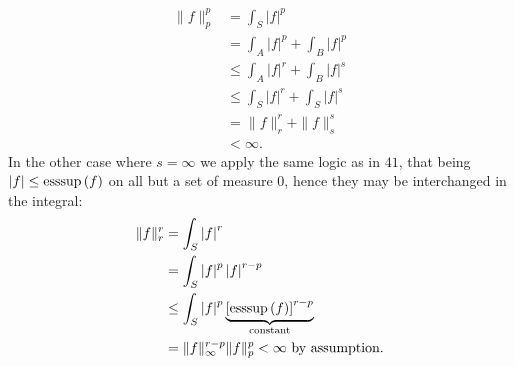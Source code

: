 \documentclass[a4paper]{article}
\begin{document}
\begin{problem}[42]
\begin{enumerate}
		\begin{align*}
			\|f\|_{p}^{p} &= \int_{S} \left| f \right| ^{p}\\
			&= \int_{A} \left| f \right| ^{p} + \int_{B} \left| f \right| ^{p} \\
			&\le \int_{A} \left| f \right| ^{r} + \int_{B} \left| f \right| ^{s} \\
			&\le \int_{S} \left| f \right| ^{r} + \int_{S} \left| f \right| ^{s}\\
			&= \|f\|_{r}^{r} + \|f\|_{s}^{s} \\
			&< \infty
		.\end{align*}
		In the other case where \(s = \infty\) we apply the same logic as in \(41\), that being \(\left| f \right| \le \operatorname{esssup} \left( f \right) \) on all but a set of measure \(0\), hence they may be interchanged in the integral:
		\begin{align*}
			\|f\|_{r}^{r} &= \int_{S} \left| f \right| ^{r} \\
				      &= \int_{S} \left| f \right| ^{p} \left| f \right| ^{r-p} \\
				      &\le \int_{S} \left| f \right| ^{p} \underbrace{\left[\operatorname{esssup}\left( f \right) \right]^{r-p}}_{\text{constant}}
				\\ &= \|f\|_{\infty}^{r-p} \|f\|_{p}^{p} < \infty \text{ by assumption}
		.\end{align*}
\end{enumerate}
\end{problem}
\newpage
\end{document}
